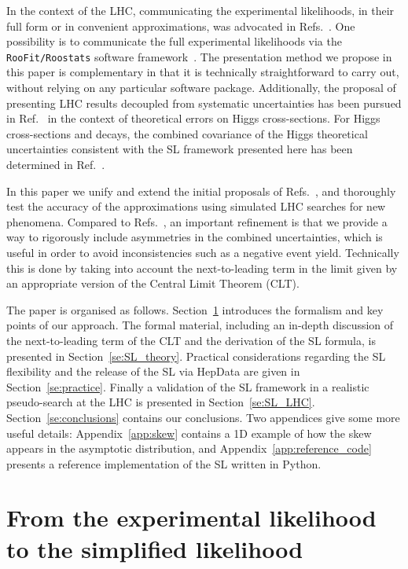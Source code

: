 \documentclass[11pt]{article}
\begin{document}
In the context of the LHC, communicating the experimental likelihoods, in their full form or in convenient approximations, was advocated in Refs.~\cite{Kraml:2012sg,Boudjema:2013qla}. 
One possibility is to communicate the full experimental likelihoods via the \texttt{RooFit/Roostats} software framework~\cite{Verkerke:2003ir,Moneta:2010pm}.  
The presentation method we propose in this paper is complementary in that it is technically straightforward to carry out, without relying on any
particular software package. Additionally, the proposal of presenting LHC results decoupled from systematic uncertainties has been pursued in Ref.~\cite{Cranmer:2013hia} in the context of theoretical errors on Higgs cross-sections. For Higgs cross-sections and decays, the combined covariance of the Higgs theoretical uncertainties consistent with the SL framework presented here has been determined in Ref.~\cite{Arbey:2016kqi}.

In this paper we unify and extend the initial proposals of Refs.~\cite{Fichet:2016gvx,SL_note}, and thoroughly test the accuracy of the approximations using simulated LHC searches for new phenomena.
Compared to Refs.~\cite{Fichet:2016gvx,SL_note}, an important  refinement is that we provide a way 
to rigorously include asymmetries in the combined uncertainties, which is useful in order to avoid inconsistencies such as a negative event yield. Technically this is done by taking into account the next-to-leading term in the limit given by an appropriate version of the Central Limit Theorem (CLT).

The paper is organised as follows. 
Section~\ref{se:EL_SL} introduces the formalism and key points of our approach.  
The formal material, including an in-depth discussion of the next-to-leading term of the CLT and the derivation of the SL formula, is presented in Section~\ref{se:SL_theory}. 
Practical considerations regarding the SL flexibility and the release of the SL via HepData are given in 
Section~\ref{se:practice}.
Finally a validation of the SL framework in a realistic pseudo-search at the LHC is presented in Section~\ref{se:SL_LHC}. 
Section~\ref{se:conclusions} contains our conclusions. 
Two appendices give some more useful details: 
Appendix~\ref{app:skew} contains a 1D example of how the skew appears in the asymptotic distribution, and 
Appendix~\ref{app:reference_code} presents a reference implementation of the SL written in Python. 


\clearpage
\section{From the experimental likelihood to the simplified likelihood}
\label{se:EL_SL}
\end{document}
